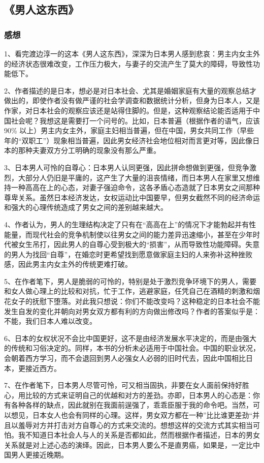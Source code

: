 \subsection{《男人这东西》}
\subsubsection{感想}

1、看完渡边淳一的这本《男人这东西》，深深为日本男人感到悲哀：男主内女主外的经济状态很难改变，工作压力极大，与妻子的交流产生了莫大的障碍，导致性功能低下。

2、作者描述的是日本，想必是对日本社会、尤其是婚姻家庭有大量的观察总结才做出的，即使作者没有做严谨的社会学调查和数据统计分析，但身为日本人，又是作家，对日本社会的观察应该还是站得住脚的。但是，这种观察结论能否适用于中国社会呢？我想这是需要打一个问号的。比如，日本普遍（根据作者的语气，应该90\% 以上）男主内女主外，家庭主妇相当普遍，但在中国，男女共同工作（早些年的“双职工”）现象相当普遍，因此男女经济社会地位相对而言更对等，因此像日本的那种夫妻双方分工明确的现象没有那么严重。

3、日本男人可怜的自尊心：日本男人认同更强，因此拼命想做到更强，但竞争激烈，大部分人仍旧是平庸的，这产生了大量的沮丧情绪，而日本男人在家里又想维持一种高高在上的心态，对妻子强迫命令，这各矛盾心态造就了日本男女之间那种尊卑关系。虽然日本经济发达，女权运动比中国要早，但男女截然不同的经济命运和强大的心理传统造成了男女之间的差别越来越大。

4、作者认为，男人的生理结构决定了只有在“高高在上”的情况下才能勃起并有性能量，而现代社会的竞争机制使以往男女之间的能力差异迅速缩小，甚至在少年时代被女生吊打，因此男人的自尊心受到极大的“损害”，从而导致性功能障碍。失意的男人为找回“自尊”，在婚恋时更希望找到愿意做家庭主妇的人来弥补这种挫败感，因此男主内女主外的传统更难打破。

5、在作者笔下，男人是脆弱的可怜的，特别是处于激烈竞争环境下的男人，需要和女人做心理上的比较和对抗，忙于工作，逃避家庭，任凭自己在酒精的刺激和烟花女子的抚慰下堕落。对此我只想说：你们不能改变吗？这种稳定的日本社会不能发生自发的变化并朝向对男女双方都有利的方向做出修改吗？作者的答案似乎是：不能，我们日本人难以改变。

6、日本的女权状况不会比中国更好，这不是由经济发展水平决定的，而是由强大的传统和习俗决定的。同样，本书的分析未必适用于中国社会。中国的职业状况，会朝着西方学习，而不会退回到男人必强女人必弱的旧时代去，因此中国相比日本，更接近西方。

7、在作者笔下，日本男人尽管可怜，可又相当固执，非要在女人面前保持好胜心，用比较的方式来证明自己的优越和对方的差劲。亦即，日本男人的心态是：你有各种各样的缺点，因此就别在我面前逞强了，乖乖臣服于我的命令吧。当然，可以想见，日本女人也会有同样的心理。这样，男女双方都在一种”比比谁更差劲“并且以羞辱对方并打击对方自尊心的方式来交流的。想想这样的交流方式其实相当可怕。我不知道日本社会人与人的关系是否都如此，然而根据作者描述，日本的男女关系就是对上述心态的演绎。因此，日本男人要么不是直男癌，如果是，一定比中国男人更接近晚期。


